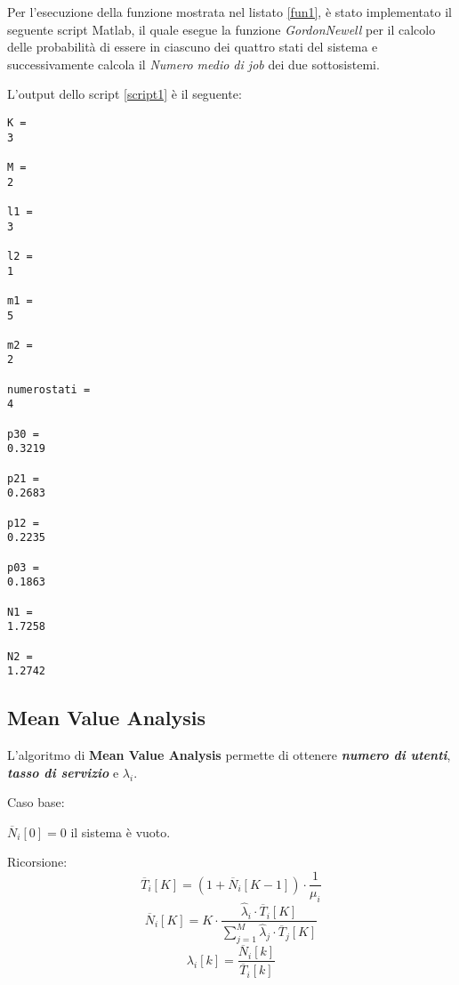 Per l'esecuzione della funzione mostrata nel listato \ref{fun1}, è stato implementato
il seguente script Matlab, il quale esegue la funzione \textit{GordonNewell}
per il calcolo delle probabilità di essere in ciascuno dei quattro stati del sistema
e successivamente calcola il \textit{Numero medio di job} dei due sottosistemi.\\

\clearpage



\vspace{0.4cm}
L'output dello script \ref{script1} è il seguente:

\color{black} \begin{verbatim}
K =
3

M =
2

l1 =
3

l2 =
1

m1 =
5

m2 =
2

numerostati =
4

p30 =
0.3219

p21 =
0.2683

p12 =
0.2235

p03 =
0.1863

N1 =
1.7258

N2 =
1.2742
\end{verbatim} \color{black}

\subsection{Mean Value Analysis}
L'algoritmo di \textbf{Mean Value Analysis} permette di ottenere \textbf{\textit{numero di utenti}},
\textbf{\textit{tasso di servizio}} e \textbf{\textit{$\lambda_i$}}.

\vspace{0.3cm}

Caso base:\\
 \begin{center}
   $\overline{N}_i[0]=0  $ il sistema è vuoto.
 \end{center}

\vspace{0.2cm}

Ricorsione:
$$ \overline{T}_i[K]=(1+\overline{N}_i[K-1])\cdot \frac{1}{\mu_i}$$
$$ \overline{N}_i[K]=K\cdot \frac{\widehat{\lambda}_i\cdot \overline{T}_i[K]}{\sum_{j=1}^M \widehat{\lambda}_j \cdot \overline{T}_j[K]}$$
$$ \lambda_i[k]=\frac{\overline{N}_i[k]}{\overline{T}_i[k]}$$
\clearpage
